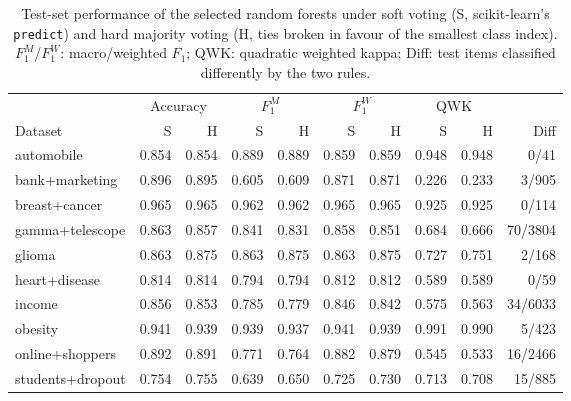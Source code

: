 \begin{table}[t]
\centering
\caption{Test-set performance of the selected random forests under soft voting (S, scikit-learn's \texttt{predict}) and hard majority voting (H, ties broken in favour of the smallest class index). $F_1^{M}$/$F_1^{W}$: macro/weighted $F_1$; QWK: quadratic weighted kappa; Diff: test items classified differently by the two rules.}
\label{tab:voting-performance}
\small
\begin{tabular}{lrrrrrrrrr}
\toprule
 & \multicolumn{2}{c}{Accuracy} & \multicolumn{2}{c}{$F_1^{M}$} & \multicolumn{2}{c}{$F_1^{W}$} & \multicolumn{2}{c}{QWK} & \\
\cmidrule(lr){2-3}\cmidrule(lr){4-5}\cmidrule(lr){6-7}\cmidrule(lr){8-9}
Dataset & S & H & S & H & S & H & S & H & Diff \\
\midrule
automobile & 0.854 & 0.854 & 0.889 & 0.889 & 0.859 & 0.859 & 0.948 & 0.948 & 0/41 \\
bank+marketing & 0.896 & 0.895 & 0.605 & 0.609 & 0.871 & 0.871 & 0.226 & 0.233 & 3/905 \\
breast+cancer & 0.965 & 0.965 & 0.962 & 0.962 & 0.965 & 0.965 & 0.925 & 0.925 & 0/114 \\
gamma+telescope & 0.863 & 0.857 & 0.841 & 0.831 & 0.858 & 0.851 & 0.684 & 0.666 & 70/3804 \\
glioma & 0.863 & 0.875 & 0.863 & 0.875 & 0.863 & 0.875 & 0.727 & 0.751 & 2/168 \\
heart+disease & 0.814 & 0.814 & 0.794 & 0.794 & 0.812 & 0.812 & 0.589 & 0.589 & 0/59 \\
income & 0.856 & 0.853 & 0.785 & 0.779 & 0.846 & 0.842 & 0.575 & 0.563 & 34/6033 \\
obesity & 0.941 & 0.939 & 0.939 & 0.937 & 0.941 & 0.939 & 0.991 & 0.990 & 5/423 \\
online+shoppers & 0.892 & 0.891 & 0.771 & 0.764 & 0.882 & 0.879 & 0.545 & 0.533 & 16/2466 \\
students+dropout & 0.754 & 0.755 & 0.639 & 0.650 & 0.725 & 0.730 & 0.713 & 0.708 & 15/885 \\
\bottomrule
\end{tabular}
\end{table}
